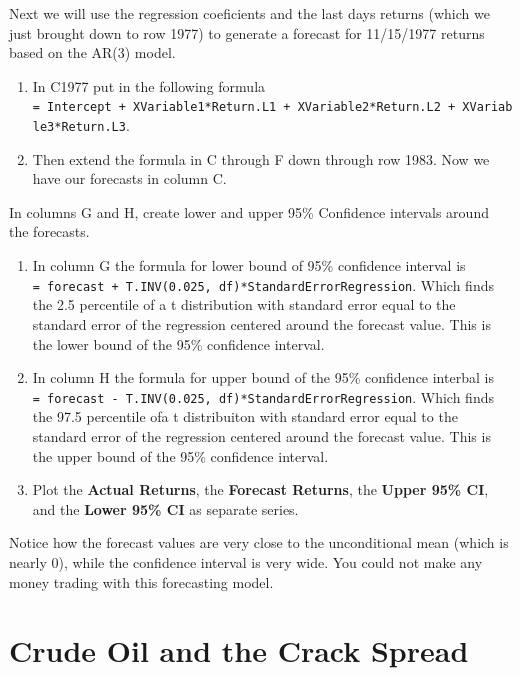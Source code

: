\documentclass[
  letterpaper,
  DIV=11,
  numbers=noendperiod]{scrreprt}
\begin{document}
Next we will use the regression coeficients and the last days returns
(which we just brought down to row 1977) to generate a forecast for
11/15/1977 returns based on the AR(3) model.

\begin{enumerate}
\def\labelenumi{\arabic{enumi}.}
\setcounter{enumi}{7}
\item
  In C1977 put in the following formula
  \texttt{=\ Intercept\ +\ XVariable1*Return.L1\ +\ XVariable2*Return.L2\ +\ XVariable3*Return.L3}.
\item
  Then extend the formula in C through F down through row 1983. Now we
  have our forecasts in column C.
\end{enumerate}

In columns G and H, create lower and upper 95\% Confidence intervals
around the forecasts.

\begin{enumerate}
\def\labelenumi{\arabic{enumi}.}
\setcounter{enumi}{9}
\item
  In column G the formula for lower bound of 95\% confidence interval is
  \texttt{=\ forecast\ +\ T.INV(0.025,\ df)*StandardErrorRegression}.
  Which finds the 2.5 percentile of a t distribution with standard error
  equal to the standard error of the regression centered around the
  forecast value. This is the lower bound of the 95\% confidence
  interval.
\item
  In column H the formula for upper bound of the 95\% confidence
  interbal is
  \texttt{=\ forecast\ -\ T.INV(0.025,\ df)*StandardErrorRegression}.
  Which finds the 97.5 percentile ofa t distribuiton with standard error
  equal to the standard error of the regression centered around the
  forecast value. This is the upper bound of the 95\% confidence
  interval.
\item
  Plot the \textbf{Actual Returns}, the \textbf{Forecast Returns}, the
  \textbf{Upper 95\% CI}, and the \textbf{Lower 95\% CI} as separate
  series.
\end{enumerate}

Notice how the forecast values are very close to the unconditional mean
(which is nearly 0), while the confidence interval is very wide. You
could not make any money trading with this forecasting model.


\hypertarget{crude-oil-and-the-crack-spread}{%
\chapter{Crude Oil and the Crack
Spread}\label{crude-oil-and-the-crack-spread}}
\end{document}
